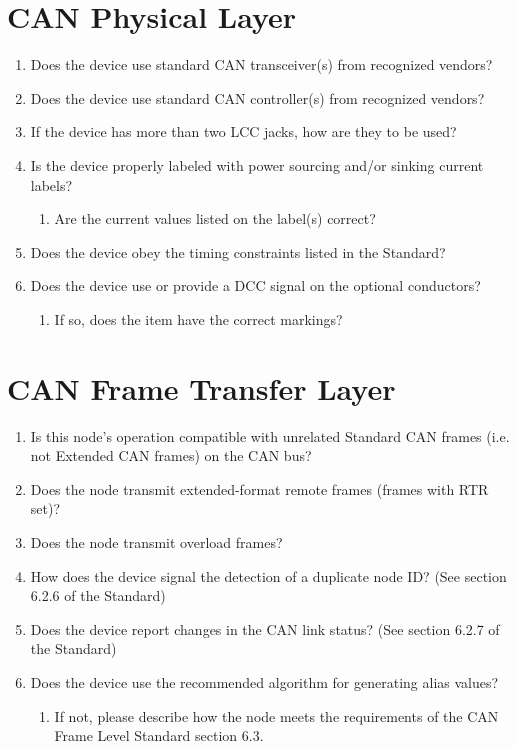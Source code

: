 \section{CAN Physical Layer}
    \begin{enumerate}
        \item Does the device use standard CAN transceiver(s) from recognized vendors?
        \item Does the device use standard CAN controller(s) from recognized vendors?
        \item If the device has more than two LCC jacks, how are they to be used?
        \item Is the device properly labeled with power sourcing and/or sinking current labels?
            \begin{enumerate}
                \item Are the current values listed on the label(s) correct?
            \end{enumerate}
        \item Does the device obey the timing constraints listed in the Standard?
        \item Does the device use or provide a DCC signal on the optional conductors?
            \begin{enumerate}
                \item If so, does the item have the correct markings?
            \end{enumerate}
    \end{enumerate}

\section{CAN Frame Transfer Layer}
    \begin{enumerate}
        \item Is this node's operation compatible with unrelated Standard CAN frames
            (i.e. not Extended CAN frames) on the CAN bus?
        \item Does the node transmit extended-format remote frames (frames with RTR set)?
        \item Does the node transmit overload frames?
        \item How does the device signal the detection of a duplicate node ID?
                (See section 6.2.6 of the Standard)
        \item Does the device report changes in the CAN link status? 
                (See section 6.2.7 of the Standard)
        \item Does the device use the recommended algorithm for generating alias values?
            \begin{enumerate}
                \item If not, please describe how the node meets the requirements of the 
                    CAN Frame Level Standard section 6.3.
            \end{enumerate}
    \end{enumerate}

